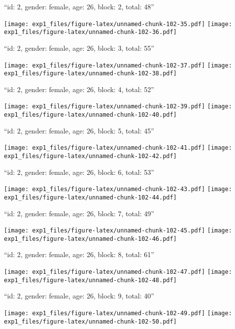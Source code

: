 \documentclass[11pt,,]{article}
\begin{document}
\newpage
[1] 

``id: 2, gender: female, age: 26, block: 2, total: 48''

\texttt{[image: exp1\_files/figure-latex/unnamed-chunk-102-35.pdf]}
\texttt{[image: exp1\_files/figure-latex/unnamed-chunk-102-36.pdf]}

\newpage
[1] 

``id: 2, gender: female, age: 26, block: 3, total: 55''

\texttt{[image: exp1\_files/figure-latex/unnamed-chunk-102-37.pdf]}
\texttt{[image: exp1\_files/figure-latex/unnamed-chunk-102-38.pdf]}

\newpage
[1] 

``id: 2, gender: female, age: 26, block: 4, total: 52''

\texttt{[image: exp1\_files/figure-latex/unnamed-chunk-102-39.pdf]}
\texttt{[image: exp1\_files/figure-latex/unnamed-chunk-102-40.pdf]}

\newpage
[1] 

``id: 2, gender: female, age: 26, block: 5, total: 45''

\texttt{[image: exp1\_files/figure-latex/unnamed-chunk-102-41.pdf]}
\texttt{[image: exp1\_files/figure-latex/unnamed-chunk-102-42.pdf]}

\newpage
[1] 

``id: 2, gender: female, age: 26, block: 6, total: 53''

\texttt{[image: exp1\_files/figure-latex/unnamed-chunk-102-43.pdf]}
\texttt{[image: exp1\_files/figure-latex/unnamed-chunk-102-44.pdf]}

\newpage
[1] 

``id: 2, gender: female, age: 26, block: 7, total: 49''

\texttt{[image: exp1\_files/figure-latex/unnamed-chunk-102-45.pdf]}
\texttt{[image: exp1\_files/figure-latex/unnamed-chunk-102-46.pdf]}

\newpage
[1] 

``id: 2, gender: female, age: 26, block: 8, total: 61''

\texttt{[image: exp1\_files/figure-latex/unnamed-chunk-102-47.pdf]}
\texttt{[image: exp1\_files/figure-latex/unnamed-chunk-102-48.pdf]}

\newpage
[1] 

``id: 2, gender: female, age: 26, block: 9, total: 40''

\texttt{[image: exp1\_files/figure-latex/unnamed-chunk-102-49.pdf]}
\texttt{[image: exp1\_files/figure-latex/unnamed-chunk-102-50.pdf]}
\end{document}
